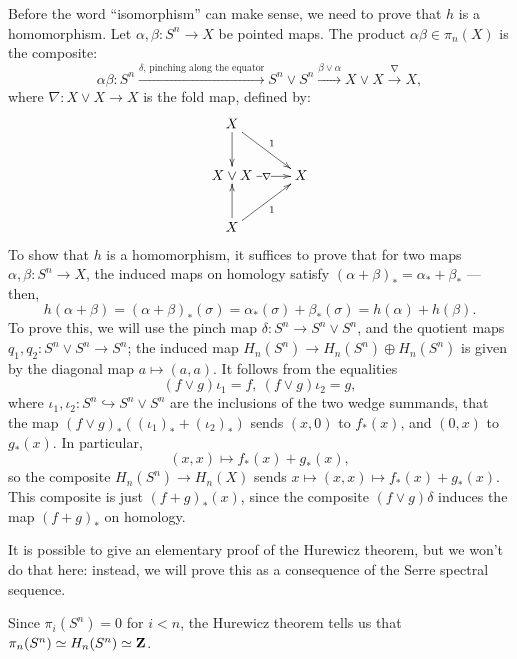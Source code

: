 Before the word ``isomorphism'' can make sense, we need to prove that $h$ is a homomorphism.
Let $\alpha,\beta:S^n\to X$ be pointed maps. The product $\alpha\beta\in \pi_n(X)$ is the composite:
$$\alpha\beta:S^n\xrightarrow{\delta\text{, pinching along the equator}} S^n\vee S^n\xrightarrow{\beta\vee\alpha}X\vee X\xrightarrow{\nabla}X,$$
where $\nabla:X\vee X\to X$ is the fold map, defined by:
\begin{equation*}
    \xymatrix{
	X\ar[dr]^1\ar[d] & \\
	X\vee X\ar[r]|\nabla & X\\
	X\ar[u]\ar[ur]_1 & 
    }
\end{equation*}
To show that $h$ is a homomorphism, it suffices to prove that for two maps $\alpha,\beta:S^n \to X$, the induced maps on homology
satisfy $(\alpha+\beta)_\ast = \alpha_\ast + \beta_\ast$ --- then,
$$h(\alpha+\beta) = (\alpha+\beta)_\ast(\sigma) = \alpha_\ast(\sigma) + \beta_\ast(\sigma) = h(\alpha) + h(\beta).$$
To prove this, we will use the pinch map $\delta:S^n \to S^n \vee S^n$, and the quotient maps $q_1,q_2:S^n\vee S^n \to S^n$;
the induced map $H_n(S^n) \to H_n(S^n) \oplus H_n(S^n)$ is given by the diagonal map $a\mapsto (a,a)$.
It follows from the equalities
$$(f\vee g)\iota_1 = f, \ (f\vee g)\iota_2 = g,$$
where $\iota_1,\iota_2:S^n\hookrightarrow S^n \vee S^n$ are the inclusions of the two wedge summands, that the map $(f\vee g)_\ast((\iota_1)_\ast + (\iota_2)_\ast)$
sends $(x,0)$ to $f_\ast(x)$, and $(0,x)$ to $g_\ast(x)$.
In particular,
$$(x,x)\mapsto f_\ast(x) + g_\ast(x),$$
so the composite $H_n(S^n) \to H_n(X)$ sends $x\mapsto (x,x) \mapsto f_\ast(x) + g_\ast(x)$.
This composite is just $(f+g)_\ast(x)$, since the composite $(f\vee g)\delta$ induces the map $(f+g)_\ast$ on homology.

It is possible to give an elementary proof of the Hurewicz theorem, but we won't do that here: instead,
we will prove this as a consequence of the Serre spectral sequence.

\begin{example}
    Since $\pi_i(S^n) = 0$ for $i<n$, the Hurewicz theorem tells us that $\pi_n(S^n) \simeq H_n(S^n) \simeq \mathbf Z$.
\end{example}

